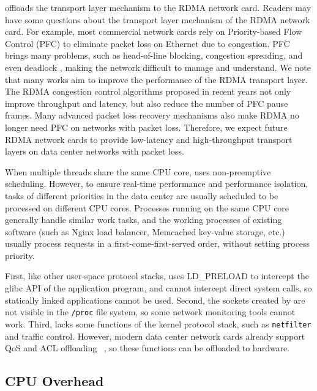 \sys{} offloads the transport layer mechanism to the RDMA network card. Readers may have some questions about the transport layer mechanism of the RDMA network card. For example, most commercial network cards rely on Priority-based Flow Control (PFC) to eliminate packet loss on Ethernet due to congestion. PFC brings many problems, such as head-of-line blocking, congestion spreading, and even deadlock \cite{guo2016rdma}, making the network difficult to manage and understand. We note that many works aim to improve the performance of the RDMA transport layer. The RDMA congestion control algorithms proposed in recent years \cite{zhu2015congestion,mprdma,mittal2015timely,hpcc} not only improve throughput and latency, but also reduce the number of PFC pause frames. Many advanced packet loss recovery mechanisms \cite{mittal2018revisiting,lu2017memory} also make RDMA no longer need PFC on networks with packet loss. Therefore, we expect future RDMA network cards to provide low-latency and high-throughput transport layers on data center networks with packet loss.

When multiple threads share the same CPU core, \sys{} uses non-preemptive scheduling. However, to ensure real-time performance and performance isolation, tasks of different priorities in the data center are usually scheduled to be processed on different CPU cores. Processes running on the same CPU core generally handle similar work tasks, and the working processes of existing software (such as Nginx load balancer, Memcached key-value storage, etc.) usually process requests in a first-come-first-served order, without setting process priority.

First, like other user-space protocol stacks, \libipc{} uses LD\_PRELOAD to intercept the glibc API of the application program, and cannot intercept direct system calls, so statically linked applications cannot be used.
Second, the sockets created by \sys{} are not visible in the \texttt{/proc} file system, so some network monitoring tools cannot work.
Third, \sys{} lacks some functions of the kernel protocol stack, such as \texttt{netfilter} and traffic control.
However, modern data center network cards already support QoS and ACL offloading ~\cite{mellanox}, so these functions can be offloaded to hardware.

\subsection{CPU Overhead}

